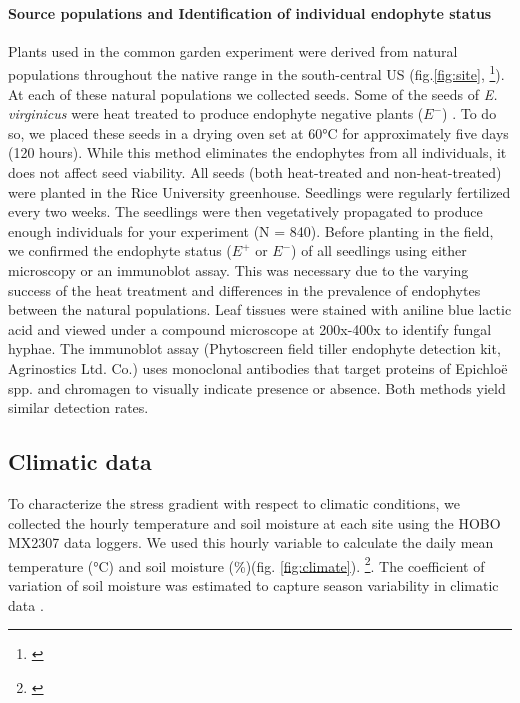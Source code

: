 \documentclass[12pt]{article}\usepackage[]{graphicx}\usepackage[dvipsnames]{xcolor}
\newcommand{\jacob}[2]{{\color{blue}{#1}}\footnote{\textit{\color{blue}{#2}}}}
\begin{document}
\paragraph {Source populations and Identification of individual endophyte status} 
Plants used  in the common garden experiment were derived from natural populations throughout the native range in the south-central US (fig.\ref{fig:site}, \jacob{Table X}{We need this table  in the Appendix}). 
At each of these natural populations we collected seeds. 
Some of the seeds of \emph{E. virginicus} were heat treated to produce endophyte negative plants ($E^-$) . 
To do so, we placed these seeds  in a drying oven set at 60°C for approximately five days (120 hours). 
While this method eliminates the endophytes from all individuals, it does not affect seed viability. 
All seeds (both heat-treated and non-heat-treated) were planted in the Rice University greenhouse.
Seedlings were regularly fertilized every two weeks. 
The seedlings were then vegetatively propagated to produce enough individuals for your experiment (N = 840).
Before planting in the field, we confirmed the endophyte status ($E^+$ or $E^-$) of all  seedlings using either microscopy or an immunoblot assay. 
This was necessary due to the varying success of the heat treatment and differences in the prevalence of endophytes between the natural populations. 
Leaf tissues were stained with aniline blue lactic acid and viewed under a compound microscope at 200x-400x to identify fungal hyphae. 
The immunoblot assay (Phytoscreen field tiller endophyte detection kit, Agrinostics Ltd. Co.) uses monoclonal antibodies that target proteins of Epichloë spp. and chromagen to visually indicate presence or absence. Both methods yield similar detection rates.  

\subsection*{Climatic data}
To characterize the stress gradient with respect to  climatic conditions, we collected the hourly temperature and soil moisture at each site using the HOBO MX2307 data loggers. We used this hourly variable to calculate the daily mean temperature (°C) and soil moisture (\%)(fig. \ref{fig:climate}). 
\jacob{We calculated the mean soil moisture and the coefficient of variation from the time the plants were placed on the ground to the time we collected demographic data}{I will change this  later}. 
The coefficient of variation of soil moisture was estimated to capture season variability in climatic data \citep{medvigy2012trends,meshram2017long}. 
\end{document}
